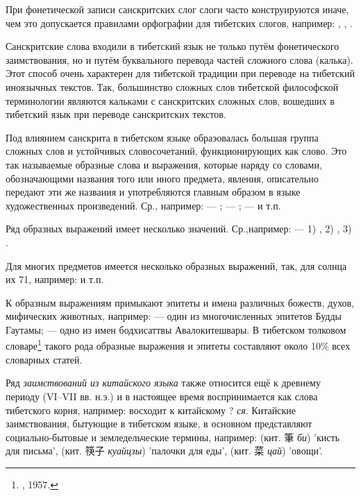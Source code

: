 При фонетической записи санскритских слог слоги часто конструируются иначе, чем это допускается правилами орфографии для тибетских слогов, например: , , .

Санскритские слова входили в тибетский язык не только путём фонетического заимствования, но и путём буквального перевода частей сложного слова (калька). Этот способ очень характерен для тибетской традиции при переводе на тибетский иноязычных текстов. Так, большинство сложных слов тибетской философской терминологии являются кальками с санскритских сложных слов, вошедших в тибетский язык при переводе санскритских текстов.

Под влиянием санскрита в тибетском языке обраэовалась большая группа сложных слов и устойчивых словосочетаний, функционирующих как слово. Это так называемые образные слова и выражения, которые наряду со словами, обозначающими названия того или иного предмета, явления, описательно передают эти же названия и употребляются главным образом в языке художественных произведений.
Ср., например:  --- ;	 --- ;  ---  и т.п.

Ряд образных выражений имеет несколько значений. Ср.,например:  --- 1) , 2) , 3) .

Для многих предметов имеется несколько образных выражений, так, для солнца их 71, например:  и т.п.

К образным выражениям примыкают эпитеты и имена различных божеств, духов, мифических животных, например:  --- один из многочисленных эпитетов Будды Гаутамы;	 --- одно из имен бодхисаттвы Авалокитешвары. В тибетском толковом словаре\footnote[18]{ , 1957. } такого рода образные выражения и эпитеты составляют около 10\% всех словарных статей.

Ряд \emph{заимствований из китайского языка} также относится ещё к древнему периоду (VI--VII вв. н.э.) и в настоящее время воспринимается как слова тибетского корня, например:  восходит к китайскому {\chinfont ?} \textit{ся}. Китайские заимствования, бытующие в тибетском языке, в основном представляют социально-бытовые и земледельческие термины, например:  (кит. {\chinfont 筆} \textit{би}) 'кисть для письма',  (кит. {\chinfont 筷子} \textit{куайцзы}) 'палочки для еды',  (кит. {\chinfont 菜} \textit{цай}) 'овощи'.

